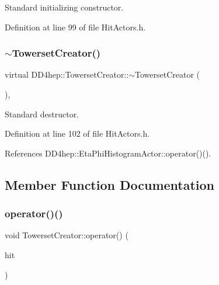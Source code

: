 Standard initializing constructor. 



Definition at line 99 of file Hit\+Actors.\+h.

\hypertarget{struct_d_d4hep_1_1_towerset_creator_ae74914cad72d7fdd2b78f97cd74b7b90}{}\label{struct_d_d4hep_1_1_towerset_creator_ae74914cad72d7fdd2b78f97cd74b7b90} 
\subsubsection{\texorpdfstring{$\sim$\+Towerset\+Creator()}{~TowersetCreator()}}
{\footnotesize\ttfamily virtual D\+D4hep\+::\+Towerset\+Creator\+::$\sim$\+Towerset\+Creator (\begin{DoxyParamCaption}{ }\end{DoxyParamCaption})\hspace{0.3cm}{\ttfamily [inline]}, {\ttfamily [virtual]}}



Standard destructor. 



Definition at line 102 of file Hit\+Actors.\+h.



References D\+D4hep\+::\+Eta\+Phi\+Histogram\+Actor\+::operator()().



\subsection{Member Function Documentation}
\hypertarget{struct_d_d4hep_1_1_towerset_creator_a5afb1ff94fd502e36e56df19effe7221}{}\label{struct_d_d4hep_1_1_towerset_creator_a5afb1ff94fd502e36e56df19effe7221} 
\subsubsection{\texorpdfstring{operator()()}{operator()()}}
{\footnotesize\ttfamily void Towerset\+Creator\+::operator() (\begin{DoxyParamCaption}\item[{const \hyperlink{class_d_d4hep_1_1_d_d_eve_hit}{D\+D\+Eve\+Hit} \&}]{hit }\end{DoxyParamCaption})\hspace{0.3cm}{\ttfamily [virtual]}}



